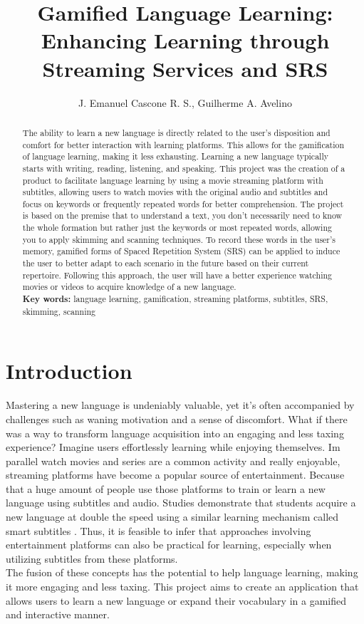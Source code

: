 \documentclass[12pt]{article}
\title{Gamified Language Learning: Enhancing Learning through Streaming Services and SRS}
\author{J. Emanuel Cascone R. S.\inst{1}, Guilherme A. Avelino\inst{1} }
\begin{document}
 

\maketitle

\begin{abstract} 
  The ability to learn a new language is directly related to the user's disposition and comfort for better interaction with learning platforms. This allows for the gamification of language learning, making it less exhausting. Learning a new language typically starts with writing, reading, listening, and speaking. This project was the creation of a product to facilitate language learning by using a movie streaming platform with subtitles, allowing users to watch movies with the original audio and subtitles and focus on keywords or frequently repeated words for better comprehension. The project is based on the premise that to understand a text, you don't necessarily need to know the whole formation but rather just the keywords or most repeated words, allowing you to apply skimming and scanning techniques. To record these words in the user's memory, gamified forms of Spaced Repetition System (SRS) can be applied to induce the user to better adapt to each scenario in the future based on their current repertoire. Following this approach, the user will have a better experience watching movies or videos to acquire knowledge of a new language. \\
  \textbf{Key words:} language learning, gamification, streaming platforms, subtitles, SRS, skimming, scanning
\end{abstract} 
\newpage


\section{Introduction} 


Mastering a new language is undeniably valuable, yet it's often accompanied by challenges such as waning motivation and a sense of discomfort. What if there was a way to transform language acquisition into an engaging and less taxing experience? Imagine users effortlessly learning while enjoying themselves. 
Im parallel watch movies and series are a common activity and really enjoyable, streaming platforms have become a popular source of entertainment. Because that a huge amount of people use those platforms to train or learn a new language using subtitles and audio.
Studies demonstrate that students acquire a new language at double the speed using a similar learning mechanism called smart subtitles \cite{Kovacs13}. Thus, it is feasible to infer that approaches involving entertainment platforms can also be practical for learning, especially when utilizing subtitles from these platforms. \\
The fusion of these concepts has the potential to help language learning, making it more engaging and less taxing. This project aims to create an application that allows users to learn a new language or expand their vocabulary in a gamified and interactive manner.
\end{document}
